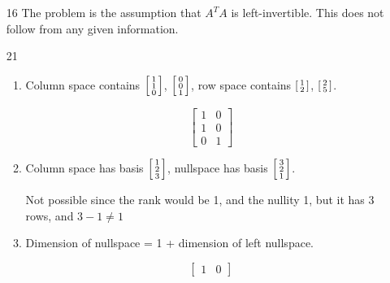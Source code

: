 \documentclass[12pt,letterpaper]{article}
\begin{document}
\begin{enumerate}[label=\S 2.\arabic*]
\begin{enumerate}
        \item [16]
          The problem is the assumption that $A^T A$ is left-invertible.
          This does not follow from any given information.
        \item [21]
          \begin{enumerate}[label=(\alph*)]
            \item
              Column space contains $\begin{bsmallmatrix}1 \\ 1 \\ 0\end{bsmallmatrix}$, $\begin{bsmallmatrix}0 \\ 0 \\ 1\end{bsmallmatrix}$, row space contains $\begin{bsmallmatrix}1 \\ 2\end{bsmallmatrix}$, $\begin{bsmallmatrix}2 \\ 5\end{bsmallmatrix}$.

                \[
                  \begin{bmatrix}
                    1 & 0 \\
                    1 & 0 \\
                    0 & 1
                  \end{bmatrix}
                \]

            \item
              Column space has basis $\begin{bsmallmatrix}1 \\ 2 \\ 3\end{bsmallmatrix}$, nullspace has basis $\begin{bsmallmatrix}3 \\ 2 \\ 1\end{bsmallmatrix}$.

              Not possible since the rank would be 1, and the nullity 1, but it has 3 rows, and $3 - 1 \ne 1$

            \item
              Dimension of nullspace = 1 + dimension of left nullspace.

              \[
                \begin{bmatrix}
                  1 & 0
                \end{bmatrix}
              \]


\end{enumerate}
\end{enumerate}
\end{enumerate}
\end{document}
